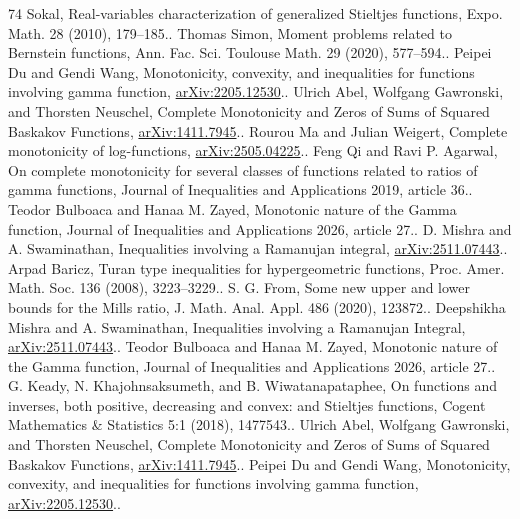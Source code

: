\begin{thebibliography}{74}
 Sokal, Real-variables characterization of generalized Stieltjes functions, Expo. Math. 28 (2010), 179--185..
 Thomas Simon, Moment problems related to Bernstein functions, Ann. Fac. Sci. Toulouse Math. 29 (2020), 577--594..
 Peipei Du and Gendi Wang, Monotonicity, convexity, and inequalities for functions involving gamma function, \href{https://arxiv.org/abs/2205.12530}{arXiv:2205.12530}..
 Ulrich Abel, Wolfgang Gawronski, and Thorsten Neuschel, Complete Monotonicity and Zeros of Sums of Squared Baskakov Functions, \href{https://arxiv.org/abs/1411.7945}{arXiv:1411.7945}..
 Rourou Ma and Julian Weigert, Complete monotonicity of log-functions, \href{https://arxiv.org/abs/2505.04225}{arXiv:2505.04225}..
 Feng Qi and Ravi P. Agarwal, On complete monotonicity for several classes of functions related to ratios of gamma functions, Journal of Inequalities and Applications 2019, article 36..
 Teodor Bulboaca and Hanaa M. Zayed, Monotonic nature of the Gamma function, Journal of Inequalities and Applications 2026, article 27..
 D. Mishra and A. Swaminathan, Inequalities involving a Ramanujan integral, \href{https://arxiv.org/abs/2511.07443}{arXiv:2511.07443}..
 Arpad Baricz, Turan type inequalities for hypergeometric functions, Proc. Amer. Math. Soc. 136 (2008), 3223--3229..
 S. G. From, Some new upper and lower bounds for the Mills ratio, J. Math. Anal. Appl. 486 (2020), 123872..
 Deepshikha Mishra and A. Swaminathan, Inequalities involving a Ramanujan Integral, \href{https://arxiv.org/abs/2511.07443}{arXiv:2511.07443}..
 Teodor Bulboaca and Hanaa M. Zayed, Monotonic nature of the Gamma function, Journal of Inequalities and Applications 2026, article 27..
 G. Keady, N. Khajohnsaksumeth, and B. Wiwatanapataphee, On functions and inverses, both positive, decreasing and convex: and Stieltjes functions, Cogent Mathematics \& Statistics 5:1 (2018), 1477543..
 Ulrich Abel, Wolfgang Gawronski, and Thorsten Neuschel, Complete Monotonicity and Zeros of Sums of Squared Baskakov Functions, \href{https://arxiv.org/abs/1411.7945}{arXiv:1411.7945}..
 Peipei Du and Gendi Wang, Monotonicity, convexity, and inequalities for functions involving gamma function, \href{https://arxiv.org/abs/2205.12530}{arXiv:2205.12530}..

\end{thebibliography}
